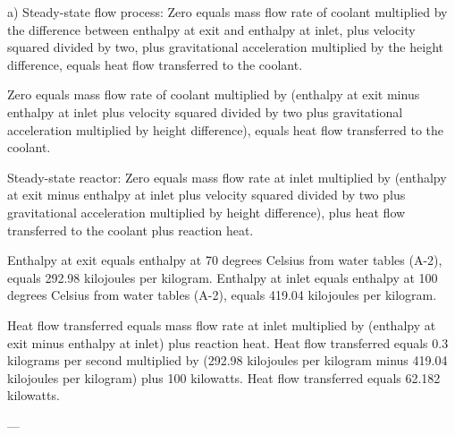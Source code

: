 a) Steady-state flow process:  
Zero equals mass flow rate of coolant multiplied by the difference between enthalpy at exit and enthalpy at inlet, plus velocity squared divided by two, plus gravitational acceleration multiplied by the height difference, equals heat flow transferred to the coolant.  

Zero equals mass flow rate of coolant multiplied by (enthalpy at exit minus enthalpy at inlet plus velocity squared divided by two plus gravitational acceleration multiplied by height difference), equals heat flow transferred to the coolant.  

Steady-state reactor:  
Zero equals mass flow rate at inlet multiplied by (enthalpy at exit minus enthalpy at inlet plus velocity squared divided by two plus gravitational acceleration multiplied by height difference), plus heat flow transferred to the coolant plus reaction heat.  

Enthalpy at exit equals enthalpy at 70 degrees Celsius from water tables (A-2), equals 292.98 kilojoules per kilogram.  
Enthalpy at inlet equals enthalpy at 100 degrees Celsius from water tables (A-2), equals 419.04 kilojoules per kilogram.  

Heat flow transferred equals mass flow rate at inlet multiplied by (enthalpy at exit minus enthalpy at inlet) plus reaction heat.  
Heat flow transferred equals 0.3 kilograms per second multiplied by (292.98 kilojoules per kilogram minus 419.04 kilojoules per kilogram) plus 100 kilowatts.  
Heat flow transferred equals 62.182 kilowatts.  

---